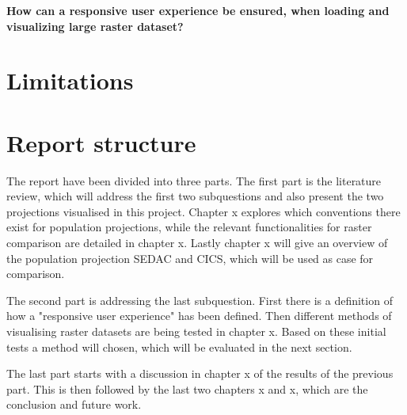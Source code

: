 \textbf{How can a responsive user experience be ensured, when loading and visualizing large raster dataset?}



\section{Limitations}

\section{Report structure}

The report have been divided into three parts. The first part is the literature review, which will address the first two subquestions and also present the two projections visualised in this project. Chapter x explores which conventions there exist for population projections, while the relevant functionalities for raster comparison are detailed in chapter x. Lastly chapter x will give an overview of the population projection SEDAC and CICS, which will be used as case for comparison.

The second part is addressing the last subquestion. First there is a definition of how a "responsive user experience" has been defined. Then different methods of visualising raster datasets are being tested in chapter x. Based on these initial tests a method will chosen, which will be evaluated in the next section.

The last part starts with a discussion in chapter x of the results of the previous part. This is then followed by the last two chapters x and x, which are the conclusion and future work.  

%
%
